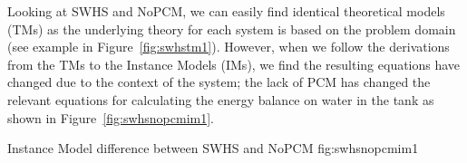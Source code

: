 Looking at SWHS and NoPCM, we can easily find identical theoretical models 
(TMs) as the underlying theory for each system is based on the problem domain 
(see example in Figure~\ref{fig:swhstm1}).
However, when we follow the derivations from the TMs to the Instance Models 
(IMs), we find the resulting equations have changed due to the context of the 
system; the lack of PCM has changed the relevant equations for calculating the 
energy balance on water in the tank as shown in Figure~\ref{fig:swhsnopcmim1}.

{Instance Model difference between SWHS and NoPCM }
{fig:swhsnopcmim1}

